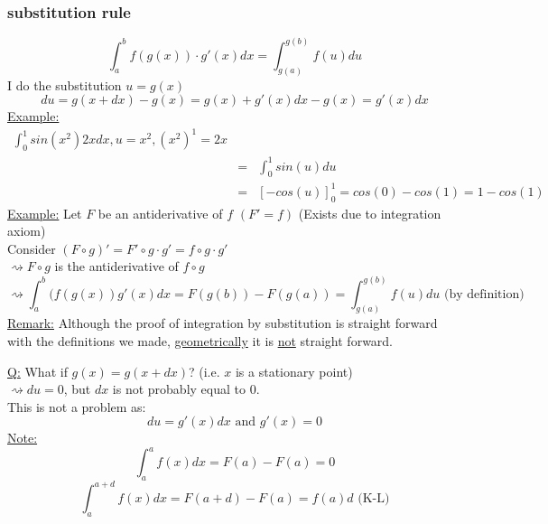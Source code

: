 \documentclass[a4paper, 12pt]{article}
\begin{document}
\subsubsection{substitution rule} $$\int_{a}^{b} f(g(x)) \cdot g'(x) dx = \int_{g(a)}^{g(b)} f(u)du$$ 
I do the substitution $u = g(x)$
$$du = g(x+dx) - g(x) = g(x) + g'(x)dx - g(x) = g'(x)dx$$
\underline{Example:}
\begin{eqnarray*}
\int_{0}^{1} sin(x^2) 2x dx, u=x^2, (x^2)^1 = 2x\\
&=& \int_{0}^{1} sin(u)du\\
&=& [-cos(u)]_{0}^{1} = cos(0) - cos(1) = 1 - cos(1)
\end{eqnarray*}
\underline{Example:}
Let $F$ be an antiderivative of $f$ $(F' = f)$ (Exists due to integration axiom)\\
Consider  $(F \circ g)' = F'\circ g\cdot g' = f \circ g \cdot g'$\\
$\rightsquigarrow F\circ g$ is the antiderivative of $f \circ g$
$$\rightsquigarrow\int^{b}_{a}(f(g(x))g'(x)dx = F(g(b)) - F(g(a)) = \int^{g(b)}_{g(a)} f(u) du \text{ (by definition)}$$
\underline{Remark:} Although the proof of integration by substitution is straight forward with the definitions we made, \underline{geometrically} it is \underline{not} straight forward.\\
\underline{Q:} What if $g(x) = g(x+dx)$? (i.e. $x$ is a stationary point)\\
$\rightsquigarrow du=0$, but $dx$ is not probably equal to $0$.\\
This is not a problem as:$$du = g'(x)dx \text{ and } g'(x) = 0$$
\underline{Note:}
$$ \int^{a}_{a} f(x) dx = F(a) - F(a) = 0$$
$$ \int^{a+d}_{a} f(x) dx = F(a+d) - F(a) = f(a)d \text{ (K-L)}$$
\end{document}
